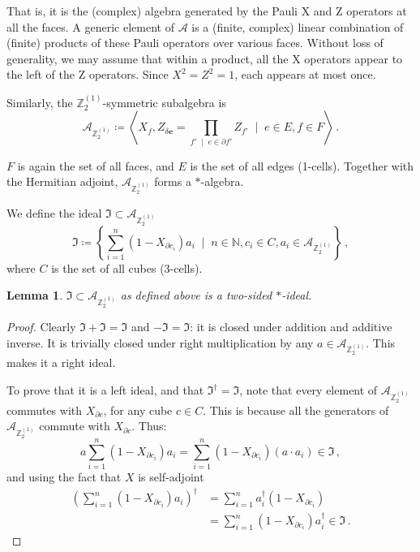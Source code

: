 \documentclass[aps,twocolumn,prx,floatfix,preprintnumbers, nofootinbib,10pt]{revtex4-2}
\numberwithin{equation}{section}
\newtheorem{lemma}[theorem]{Lemma}
\theoremstyle{definition}
\theoremstyle{remark}
\theoremstyle{claim}
\newcommand{\be}{\begin{equation}}
\newcommand{\ee}{\end{equation}}
\newcommand{\Z}{{\mathbb Z}}
\newcommand{\mc}[1]{\mathcal{#1}}
\newcommand{\paren}[1]{\left( #1 \right)}
\newcommand{\curpar}[1]{\left\{ #1 \right\}}
\begin{document}
That is, it is the (complex) algebra generated by the Pauli X and Z operators at all the faces. A generic element of $\mc{A}$ is a (finite, complex) linear combination of (finite) products of these Pauli operators over various faces. Without loss of generality, we may assume that within a product, all the X operators appear to the left of the Z operators. Since $X^2 = Z^2 = 1$, each appears at most once.

Similarly, the $\Z_2^{(1)}$-symmetric subalgebra is
\be
\mc{A}_{\Z_2^{(1)}} \coloneqq \left\langle X_f, Z_{\delta \bm{e}} = \prod_{f' \; \mid \; e \in \partial f'} Z_{f'} \; \mid \; e \in E, f \in F \right\rangle \,.
\ee

$F$ is again the set of all faces, and $E$ is the set of all edges (1-cells). Together with the Hermitian adjoint, $\mc{A}_{\Z_2^{(1)}}$ forms a $*$-algebra.

We define the ideal $\mathfrak{I} \subset \mc{A}_{\Z_2^{(1)}}$
\be
\mathfrak{I} \coloneqq \curpar{ \sum_{i=1}^n (1 - X_{\partial c_i}) a_i \; \mid \; n \in \mathbb{N}, c_i \in C, a_i \in \mc{A}_{\Z_2^{(1)}}} \,,
\ee
where $C$ is the set of all cubes (3-cells).

\begin{lemma}
 $\mathfrak{I} \subset \mc{A}_{\Z_2^{(1)}}$ as defined above is a two-sided $*$-ideal.
\end{lemma}

\begin{proof}
 Clearly $\mathfrak{I} + \mathfrak{I} = \mathfrak{I}$ and $-\mathfrak{I} = \mathfrak{I}$: it is closed under addition and additive inverse. It is trivially closed under right multiplication by any $a \in \mc{A}_{\Z_2^{(1)}}$. This makes it a right ideal.

 To prove that it is a left ideal, and that $\mathfrak{I}^\dag = \mathfrak{I}$, note that every element of $\mc{A}_{\Z_2^{(1)}}$ commutes with $X_{\partial c}$, for any cube $c \in C$. This is because all the generators of $\mc{A}_{\Z_2^{(1)}}$ commute with $X_{\partial c}$. Thus:
 \be
 a \sum_{i=1}^n (1 - X_{\partial c_i}) a_i = \sum_{i=1}^n (1 - X_{\partial c_i}) (a \cdot a_i) \in \mathfrak{I} \,,
 \ee
 and using the fact that $X$ is self-adjoint
 \begin{align}
  \paren{\sum_{i=1}^n (1 - X_{\partial c_i}) a_i}^\dag &= \sum_{i=1}^n a_i^\dag (1 - X_{\partial c_i}) \nonumber \\
  &= \sum_{i=1}^n (1 - X_{\partial c_i}) a_i^\dag \in \mathfrak{I} \,.
 \end{align}
\end{proof}
\end{document}

